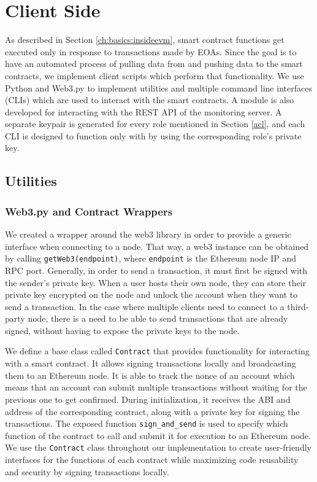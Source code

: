 

\section{Client Side} \label{ch:implementation:client}

As described in Section \ref{ch:basics:insideevm}, smart contract functions get executed only in response to transactions made by EOAs. Since the goal is to have an automated process of pulling data from and pushing data to the smart contracts, we implement client scripts which perform that functionality. We use Python and Web3.py to implement utilities and multiple command line interfaces (CLIs) which are used to interact with the smart contracts. A module is also developed for interacting with the REST API of the monitoring server. A separate keypair is generated for every role mentioned in Section \ref{acl}, and each CLI is designed to function only with by using the corresponding role's private key.

\subsection{Utilities} \label{utils}

\subsubsection*{Web3.py and Contract Wrappers}
We created a wrapper around the web3 library in order to provide a generic interface when connecting to a node. That way, a web3 instance can be obtained by calling \texttt{getWeb3(endpoint)}, where \texttt{endpoint} is the Ethereum node IP and RPC port. Generally, in order to send a transaction, it must first be signed with the sender's private key. When a user hosts their own node, they can store their private key encrypted on the node and unlock the account when they want to send a transaction. In the case where multiple clients need to connect to a third-party node, there is a need to be able to send transactions that are already signed, without having to expose the private keys to the node.

We define a base class called \texttt{Contract} that provides functionality for interacting  with a smart contract. It allows signing transactions locally and broadcasting them to an Ethereum node. It is able to track the nonce of an account which means that an account can submit multiple transactions without waiting for the previous one to get confirmed. During initialization, it receives the ABI and address of the corresponding contract, along with a private key for signing the transactions. The exposed function \texttt{sign\_and\_send} is used to specify which function of the contract to call and submit it for execution to an Ethereum node. We use the \texttt{Contract} class throughout our implementation to create user-friendly interfaces for the functions of each contract while maximizing code reusability and security by signing transactions locally.

